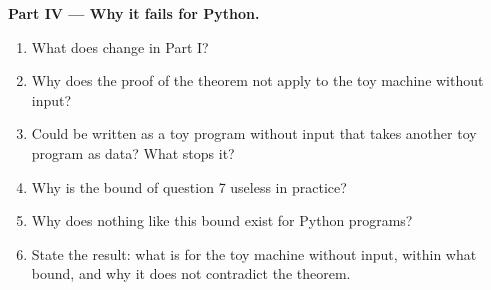 \begin{problem}
\medskip\noindent\textbf{Part IV --- Why it fails for Python.}
\begin{enumerate}[resume]
  \item What does  change in Part I?
  \item Why does the proof of the theorem not apply to the toy machine without input?
  \item Could  be written as a toy program without input that takes another toy program as data?
    What stops it?
  \item Why is the bound of question 7 useless in practice?
  \item Why does nothing like this bound exist for Python programs?
  \item State the result: what is  for the toy machine without input, within what bound, and why it does
    not contradict the theorem.
\end{enumerate}
\end{problem}
